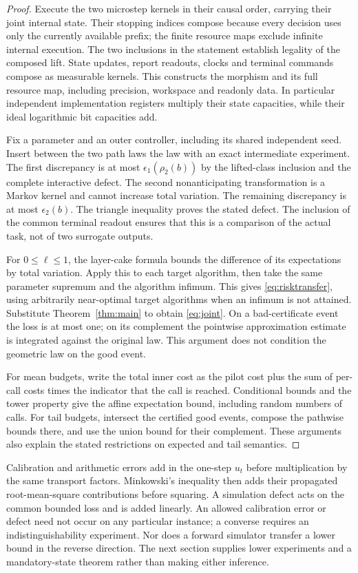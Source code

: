 \begin{proof}
Execute the two microstep kernels in their causal order, carrying their joint internal state. Their stopping indices compose because every decision uses only the currently available prefix; the finite resource maps exclude infinite internal execution. The two inclusions in the statement establish legality of the composed lift. State updates, report readouts, clocks and terminal commands compose as measurable kernels. This constructs the morphism and its full resource map, including precision, workspace and readonly data. In particular independent implementation registers multiply their state capacities, while their ideal logarithmic bit capacities add.

Fix a parameter and an outer controller, including its shared independent seed. Insert between the two path laws the law with an exact intermediate experiment. The first discrepancy is at most $\epsilon_1(\rho_2(b))$ by the lifted-class inclusion and the complete interactive defect. The second nonanticipating transformation is a Markov kernel and cannot increase total variation. The remaining discrepancy is at most $\epsilon_2(b)$. The triangle inequality proves the stated defect. The inclusion of the common terminal readout ensures that this is a comparison of the actual task, not of two surrogate outputs.

For $0\le\ell\le1$, the layer-cake formula bounds the difference of its expectations by total variation. Apply this to each target algorithm, then take the same parameter supremum and the algorithm infimum. This gives \eqref{eq:risktransfer}, using arbitrarily near-optimal target algorithms when an infimum is not attained. Substitute Theorem~\ref{thm:main} to obtain \eqref{eq:joint}. On a bad-certificate event the loss is at most one; on its complement the pointwise approximation estimate is integrated against the original law. This argument does not condition the geometric law on the good event.

For mean budgets, write the total inner cost as the pilot cost plus the sum of per-call costs times the indicator that the call is reached. Conditional bounds and the tower property give the affine expectation bound, including random numbers of calls. For tail budgets, intersect the certified good events, compose the pathwise bounds there, and use the union bound for their complement. These arguments also explain the stated restrictions on expected and tail semantics.
\end{proof}

Calibration and arithmetic errors add in the one-step $u_t$ before multiplication by the same transport factors. Minkowski's inequality then adds their propagated root-mean-square contributions before squaring. A simulation defect acts on the common bounded loss and is added linearly. An allowed calibration error or defect need not occur on any particular instance; a converse requires an indistinguishability experiment. Nor does a forward simulator transfer a lower bound in the reverse direction. The next section supplies lower experiments and a mandatory-state theorem rather than making either inference.
